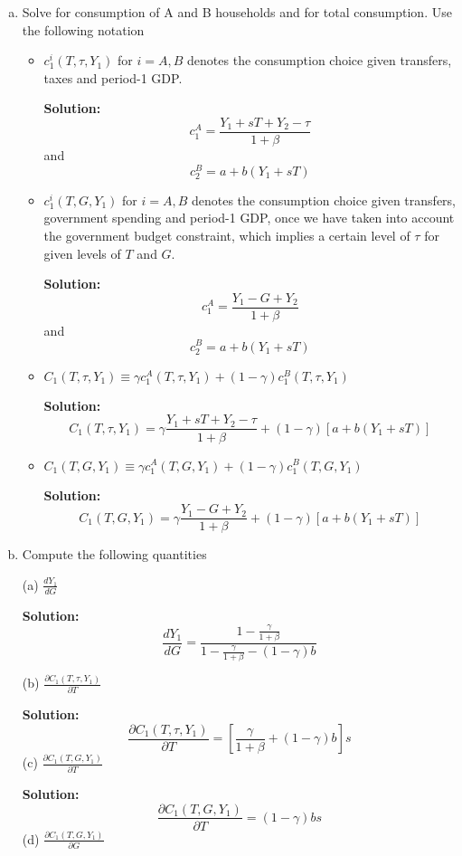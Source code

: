 \documentclass[11pt]{extarticle}
\theoremstyle{plain}
\theoremstyle{definition}
\begin{document}
\begin{enumerate}[(a)]
\item Solve for consumption of A and B households and for total consumption. Use the following
notation

\begin{itemize}
\item $c_1^i\left(T, \tau, Y_1\right)$ for $i=A, B$ denotes the consumption choice given transfers, taxes and period-1 GDP.

\textbf{Solution:}
$$
c_1^A=\frac{Y_1+s T+Y_2-\tau}{1+\beta}
$$
and
$$
c_2^B=a+b\left(Y_1+s T\right)
$$
\item $c_1^i\left(T, G, Y_1\right)$ for $i=A, B$ denotes the consumption choice given transfers, government spending and period-1 GDP, once we have taken into account the government budget constraint, which implies a certain level of $\tau$ for given levels of $T$ and $G$.

\textbf{Solution:}
$$
c_1^A=\frac{Y_1-G+Y_2}{1+\beta}
$$
and
$$
c_2^B=a+b\left(Y_1+s T\right)
$$

\item $C_1\left(T, \tau, Y_1\right) \equiv \gamma c_1^A\left(T, \tau, Y_1\right)+(1-\gamma) c_1^B\left(T, \tau, Y_1\right)$

\textbf{Solution:}
$$
C_1\left(T, \tau, Y_1\right)=\gamma \frac{Y_1+s T+Y_2-\tau}{1+\beta}+(1-\gamma)\left[a+b\left(Y_1+s T\right)\right]
$$
\item $C_1\left(T, G, Y_1\right) \equiv \gamma c_1^A\left(T, G, Y_1\right)+(1-\gamma) c_1^B\left(T, G, Y_1\right)$

\textbf{Solution:}
$$
C_1\left(T, G, Y_1\right)=\gamma \frac{Y_1-G+Y_2}{1+\beta}+(1-\gamma)\left[a+b\left(Y_1+s T\right)\right]
$$

\end{itemize}

\item Compute the following quantities

(a) $\frac{d Y_1}{d G}$

\textbf{Solution:}
$$
\frac{d Y_1}{d G}=\frac{1-\frac{\gamma}{1+\beta}}{1-\frac{\gamma}{1+\beta}-(1-\gamma) b}
$$

(b) $\frac{\partial C_1\left(T, \tau, Y_1\right)}{\partial T}$

\textbf{Solution:}
$$
\frac{\partial C_1\left(T, \tau, Y_1\right)}{\partial T}=\left[\frac{\gamma}{1+\beta}+(1-\gamma) b\right] s
$$
(c) $\frac{\partial C_1\left(T, G, Y_1\right)}{\partial T}$

\textbf{Solution:}
$$
\frac{\partial C_1\left(T, G, Y_1\right)}{\partial T}=(1-\gamma) b s
$$
(d) $\frac{\partial C_1\left(T, G, Y_1\right)}{\partial G}$


\end{enumerate}
\end{document}
